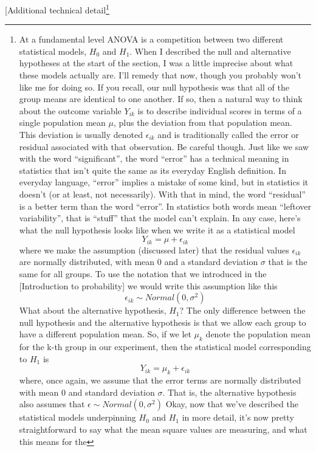 \documentclass[
  a4paper,
]{book}
\begin{document}
{[}Additional technical detail\footnote{At a fundamental level ANOVA is
  a competition between two different statistical models, \(H_0\) and
  \(H_1\). When I described the null and alternative hypotheses at the
  start of the section, I was a little imprecise about what these models
  actually are. I'll remedy that now, though you probably won't like me
  for doing so. If you recall, our null hypothesis was that all of the
  group means are identical to one another. If so, then a natural way to
  think about the outcome variable \(Y_{ik}\) is to describe individual
  scores in terms of a single population mean \(\mu\), plus the
  deviation from that population mean. This deviation is usually denoted
  \(\epsilon_{ik}\) and is traditionally called the error or residual
  associated with that observation. Be careful though. Just like we saw
  with the word ``significant'', the word ``error'' has a technical
  meaning in statistics that isn't quite the same as its everyday
  English definition. In everyday language, ``error'' implies a mistake
  of some kind, but in statistics it doesn't (or at least, not
  necessarily). With that in mind, the word ``residual'' is a better
  term than the word ``error''. In statistics both words mean ``leftover
  variability'', that is ``stuff'' that the model can't explain. In any
  case, here's what the null hypothesis looks like when we write it as a
  statistical model \[Y_{ik}=\mu+\epsilon_{ik}\] where we make the
  assumption (discussed later) that the residual values
  \(\epsilon_{ik}\) are normally distributed, with mean \(0\) and a
  standard deviation \(\sigma\) that is the same for all groups. To use
  the notation that we introduced in the {[}Introduction to
  probability{]} we would write this assumption like this
  \[\epsilon_{ik} \sim Normal(0,\sigma^2)\] What about the alternative
  hypothesis, \(H_1\)? The only difference between the null hypothesis
  and the alternative hypothesis is that we allow each group to have a
  different population mean. So, if we let \(\mu_k\) denote the
  population mean for the k-th group in our experiment, then the
  statistical model corresponding to \(H_1\) is
  \[Y_{ik}=\mu_k+\epsilon_{ik}\] where, once again, we assume that the
  error terms are normally distributed with mean 0 and standard
  deviation \(\sigma\). That is, the alternative hypothesis also assumes
  that \(\epsilon \sim Normal(0,\sigma^2)\) Okay, now that we've
  described the statistical models underpinning \(H_0\) and \(H_1\) in
  more detail, it's now pretty straightforward to say what the mean
  square values are measuring, and what this means for the
}
\end{document}
